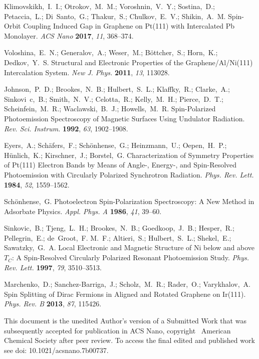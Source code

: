 \documentclass[twocolumn,preprintnumbers,amsmath,amssymb,prl]{revtex4}
\begin{document}
%

\begin{thebibliography}{10}

Klimovskikh,~I.~I.; Otrokov,~M.~M.; Voroshnin,~V.~Y.; Sostina,~D.;
  Petaccia,~L.; Di~Santo,~G.; Thakur,~S.; Chulkov,~E.~V.; Shikin,~A.~M. Spin-Orbit Coupling Induced Gap in Graphene on Pt(111) with Intercalated Pb Monolayer.
  \textit{ACS Nano} \textbf{2017}, \textit{11}, 368--374.
  
Voloshina,~E.~N.; Generalov,~A.; Weser,~M.; B{\"o}ttcher,~S.; Horn,~K.;
  Dedkov,~Y.~S. Structural and Electronic Properties of the Graphene/Al/Ni(111) Intercalation System. \textit{New J. Phys.} \textbf{2011}, \textit{13}, 113028.

Johnson,~P.~D.; Brookes,~N.~B.; Hulbert,~S.~L.; Klaffky,~R.; Clarke,~A.;
  Sinkovi~c,~B.; Smith,~N.~V.; Celotta,~R.; Kelly,~M.~H.; Pierce,~D.~T.;
  Scheinfein,~M.~R.; Waclawski,~B.~J.; Howells,~M.~R. Spin-Polarized Photoemission Spectroscopy of Magnetic Surfaces Using Undulator Radiation. \textit{Rev. Sci. Instrum.}
  \textbf{1992}, \textit{63}, 1902--1908.
  
Eyers,~A.; Sch\"afers,~F.; Sch\"onhense,~G.; Heinzmann,~U.; Oepen,~H.~P.;
  H\"unlich,~K.; Kirschner,~J.; Borstel,~G. Characterization of Symmetry Properties of Pt(111) Electron Bands by Means of Angle-, Energy-, and Spin-Resolved Photoemission with Circularly Polarized Synchrotron Radiation. \textit{Phys. Rev. Lett.} \textbf{1984}, \textit{52},
  1559--1562.

Sch{\"o}nhense,~G. Photoelectron Spin-Polarization Spectroscopy: A New Method in Adsorbate Physics. \textit{Appl. Phys. A} \textbf{1986},
  \textit{41}, 39--60.

Sinkovic,~B.; Tjeng,~L.~H.; Brookes,~N.~B.; Goedkoop,~J.~B.; Hesper,~R.;
  Pellegrin,~E.; de~Groot,~F. M.~F.; Altieri,~S.; Hulbert,~S.~L.; Shekel,~E.;
  Sawatzky,~G.~A. Local Electronic and Magnetic Structure of Ni below and above $T_C$: A Spin-Resolved Circularly Polarized Resonant Photoemission Study. \textit{Phys. Rev. Lett.} \textbf{1997}, \textit{79},
  3510--3513.

Marchenko,~D.; Sanchez-Barriga,~J.; Scholz,~M.~R.; Rader,~O.; Varykhalov,~A. Spin Splitting of Dirac Fermions in Aligned and Rotated Graphene on Ir(111).
  \textit{Phys. Rev. B} \textbf{2013}, \textit{87}, 115426.

\end{thebibliography}

This document is the unedited Author's version of a Submitted Work that was subsequently accepted for publication in ACS Nano, copyright \textcopyright\, American Chemical Society after peer review. To access the final edited and published work see doi: 10.1021/acsnano.7b00737.
\end{document}
